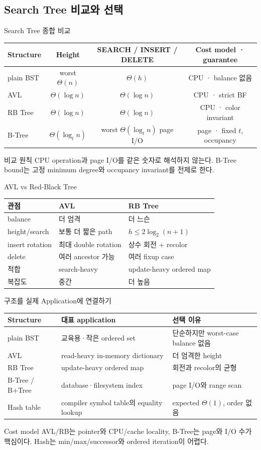 \subsection{Search Tree 비교와 선택}
\begin{frame}{Search Tree 종합 비교}
\small\centering\begin{tabular}{lccc}\toprule
Structure&Height&SEARCH / INSERT / DELETE&Cost model · guarantee\\\midrule
plain BST&worst $\Theta(n)$&$\Theta(h)$&CPU · balance 없음\\
AVL&$\Theta(\log n)$&$\Theta(\log n)$&CPU · strict BF\\
RB Tree&$\Theta(\log n)$&$\Theta(\log n)$&CPU · color invariant\\
B-Tree&$\Theta(\log_t n)$&worst $\Theta(\log_t n)$ page I/O&page · fixed $t$, occupancy\\\bottomrule
\end{tabular}
\begin{block}{비교 원칙}
CPU operation과 page I/O를 같은 숫자로 해석하지 않는다. B-Tree bound는 고정 minimum degree와 occupancy invariant를 전제로 한다.
\end{block}
\end{frame}
\begin{frame}{AVL vs Red-Black Tree}
\small\begin{tabular}{lll}\toprule
관점&AVL&RB Tree\\\midrule
balance&더 엄격&더 느슨\\
height/search&보통 더 짧은 path&$h\le2\log_2(n+1)$\\
insert rotation&최대 double rotation&상수 회전 + recolor\\
delete&여러 ancestor 가능&여러 fixup case\\
적합&search-heavy&update-heavy ordered map\\
복잡도&중간&더 높음\\\bottomrule
\end{tabular}
\end{frame}
\begin{frame}{구조를 실제 Application에 연결하기}
\footnotesize\centering
\begin{tabular}{@{}l>{\raggedright\arraybackslash}p{}>{\raggedright\arraybackslash}p{}@{}}\toprule
Structure&대표 application&선택 이유\\\midrule
plain BST&교육용·작은 ordered set&단순하지만 worst-case balance 없음\\
AVL&read-heavy in-memory dictionary&더 엄격한 height\\
RB Tree&update-heavy ordered map&회전과 recolor의 균형\\
B-Tree / B+Tree&database·filesystem index&page I/O와 range scan\\
Hash table&compiler symbol table의 equality lookup&expected $\Theta(1)$, order 없음\\\bottomrule
\end{tabular}
\begin{block}{Cost model}
AVL/RB는 pointer와 CPU/cache locality, B-Tree는 page와 I/O 수가 핵심이다. Hash는 min/max/successor와 ordered iteration이 어렵다.
\end{block}
\end{frame}
